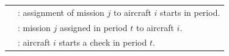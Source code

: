 \begin{frame}
\frametitle{\textbf{\firsttitleF}}
  \begin{tabular}{ll}
    \onslide<+->{
      $a^s_{ijt}$ &  : assignment of mission $j$ to aircraft $i$ starts in period.
    }  \\
    \onslide<+->{
      $a_{ijt}$ &  :  mission $j$ assigned in period $t$ to aircraft $i$.
    }  \\
    \onslide<4->{
      $m_{it}$   & :  aircraft $i$ starts a check in period $t$.
    }
  \end{tabular}

  
\end{frame}

